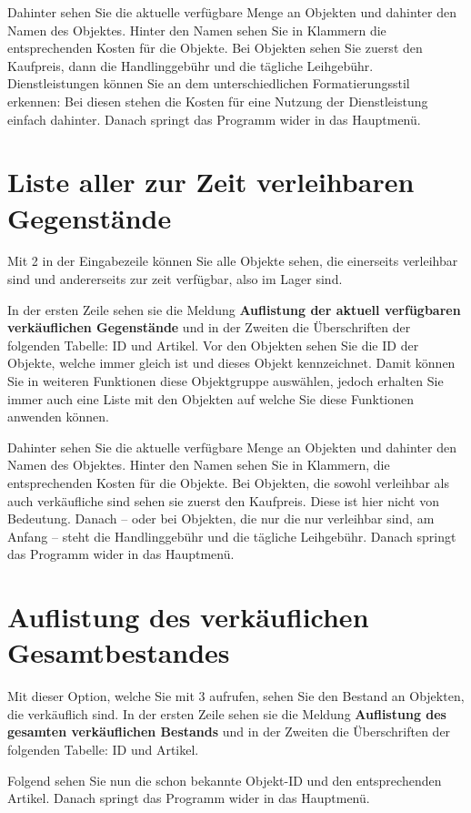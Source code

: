 ﻿\documentclass[a4paper,12pt,titlepage]{article}
\newcommand\enquote[1]{{\ttfamily \bfseries #1}}
\begin{document}
Dahinter sehen Sie die aktuelle verfügbare Menge an Objekten und dahinter den Namen des Objektes.
Hinter den Namen sehen Sie in Klammern die entsprechenden Kosten für die Objekte.
Bei Objekten sehen Sie zuerst den Kaufpreis, dann die Handlinggebühr und die tägliche Leihgebühr.
Dienstleistungen können Sie an dem unterschiedlichen Formatierungsstil erkennen:
Bei diesen stehen die Kosten für eine Nutzung der Dienstleistung einfach dahinter.
Danach springt das Programm wider in das Hauptmenü.
\section{Liste aller zur Zeit verleihbaren Gegenstände}
Mit 2 in der Eingabezeile können Sie alle Objekte sehen,
 die einerseits verleihbar sind und andererseits zur zeit verfügbar, also im Lager sind.

In der ersten Zeile sehen sie die Meldung \enquote{Auflistung der aktuell verfügbaren verkäuflichen Gegenstände}
 und in der Zweiten die Überschriften der folgenden Tabelle: ID und Artikel.
Vor den Objekten sehen Sie die ID der Objekte, welche immer gleich ist und dieses Objekt kennzeichnet.
Damit können Sie in weiteren Funktionen diese Objektgruppe auswählen,
 jedoch erhalten Sie immer auch eine Liste mit den Objekten auf welche Sie diese Funktionen anwenden können.

Dahinter sehen Sie die aktuelle verfügbare Menge an Objekten und dahinter den Namen des Objektes.
Hinter den Namen sehen Sie in Klammern, die entsprechenden Kosten für die Objekte.
Bei Objekten, die sowohl verleihbar als auch verkäufliche sind sehen sie zuerst den Kaufpreis.
Diese ist hier nicht von Bedeutung.
Danach -- oder bei Objekten, die nur die nur verleihbar sind, am Anfang --
steht die Handlinggebühr und die tägliche Leihgebühr.
Danach springt das Programm wider in das Hauptmenü.

\section{Auflistung des verkäuflichen Gesamtbestandes}
Mit dieser Option, welche Sie mit 3 aufrufen, sehen Sie den Bestand an Objekten, die verkäuflich sind.
In der ersten Zeile sehen sie die Meldung \enquote{Auflistung des gesamten verkäuflichen Bestands}
 und in der Zweiten die Überschriften der folgenden Tabelle: ID und Artikel.

Folgend sehen Sie nun die schon bekannte Objekt-ID und den entsprechenden Artikel.
Danach springt das Programm wider in das Hauptmenü.
\end{document}
